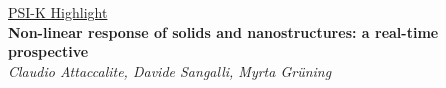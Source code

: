 \documentclass[12pt]{book}
\renewcommand{\baselinestretch}{1.2}
\newcommand{\clearemptydoublepage}{\newpage{\pagestyle{empty}\cleardoublepage}}
\renewcommand{\[}{\left[}
\renewcommand{\]}{\right]}
\renewcommand{\(}{\left(}
\renewcommand{\)}{\right)}
\renewcommand{\[}{\left[}
\renewcommand{\]}{\right]}
\renewcommand{\(}{\left(}
\renewcommand{\)}{\right)}
\begin{document}
\pagestyle{empty}

\begin{center}

\begin{figure}
\hspace{2cm}
\end{figure}
\vspace{-2cm}
\Large{\underline{PSI-K Highlight}}\\
\vspace{1cm}
\LARGE{
{\bf Non-linear response of solids and nanostructures: a real-time prospective}}\\
\vspace{1cm}
\Large{\it Claudio Attaccalite, Davide Sangalli, Myrta Gr\"uning}\\[1cm]
\end{center}

\clearemptydoublepage


\pagestyle{plain}

\setcounter{tocdepth}{4}
\renewcommand{\baselinestretch}{1.5}
\tableofcontents
\clearemptydoublepage
%
\clearemptydoublepage



\clearemptydoublepage


\clearemptydoublepage

%

%

%


\clearemptydoublepage

%
\clearemptydoublepage


%
{\footnotesize
\printbibliography}
\end{document}
